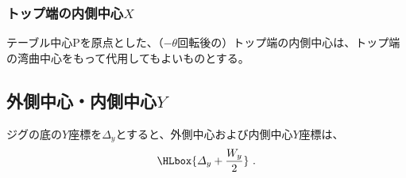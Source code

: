 \subsubsection{トップ端の内側中心\texorpdfstring{$X$}{X}}
テーブル中心Pを原点とした、（$-\theta$回転後の）トップ端の内側中心は、トップ端の湾曲中心をもって代用してもよいものとする。


\subsection{外側中心・内側中心\texorpdfstring{$Y$}{Y}}
ジグの底の$Y$座標を$\varDelta_y$とすると、外側中心および内側中心$Y$座標は、
\begin{align*}
  \HLbox{\varDelta_y+\frac{W_y}2}\ .
\end{align*}
